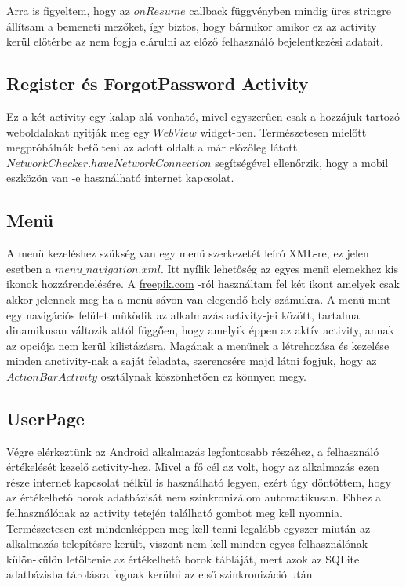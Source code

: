 \documentclass[12pt]{report}
\theoremstyle{definition}
\begin{document}
	Arra is figyeltem, hogy az $onResume$ callback függvényben mindig üres stringre állítsam a bemeneti mezőket, így biztos, hogy bármikor amikor ez az activity kerül előtérbe az nem fogja elárulni az előző felhasználó bejelentkezési adatait.
	
	\subsection{Register és ForgotPassword Activity}
	Ez a két activity egy kalap alá vonható, mivel egyszerűen csak a hozzájuk tartozó weboldalakat nyitják meg egy $WebView$ widget-ben. Természetesen mielőtt megpróbálnák betölteni az adott oldalt a már előzőleg látott $NetworkChecker.haveNetworkConnection$ segítségével ellenőrzik, hogy a mobil eszközön van -e használható internet kapcsolat.
	
	\subsection{Menü}
	A menü kezeléshez szükség van egy menü szerkezetét leíró XML-re, ez jelen esetben a $menu\_navigation.xml$. Itt nyílik lehetőség az egyes menü elemekhez kis ikonok hozzárendelésére. A \url{freepik.com} -ról használtam fel két ikont amelyek csak akkor jelennek meg ha a menü sávon van elegendő hely számukra. A menü mint egy navigációs felület működik az alkalmazás activity-jei között, tartalma dinamikusan változik attól függően, hogy amelyik éppen az aktív activity, annak az opciója nem kerül kilistázásra. Magának a menünek a létrehozása és kezelése minden anctivity-nak a saját feladata, szerencsére majd látni fogjuk, hogy az $ActionBarActivity$ osztálynak köszönhetően ez könnyen megy.
	
	\subsection{UserPage}
	Végre elérkeztünk az Android alkalmazás legfontosabb részéhez, a felhasználó értékelését kezelő activity-hez. Mivel a fő cél az volt, hogy az alkalmazás ezen része internet kapcsolat nélkül is használható legyen, ezért úgy döntöttem, hogy az értékelhető borok adatbázisát nem szinkronizálom automatikusan. Ehhez a felhasználónak az activity tetején található gombot meg kell nyomnia. Természetesen ezt mindenképpen meg kell tenni legalább egyszer miután az alkalmazás telepítésre került, viszont nem kell minden egyes felhasználónak külön-külön letöltenie az értékelhető borok tábláját, mert azok az SQLite adatbázisba tárolásra fognak kerülni az első szinkronizáció után.
	
\end{document}

